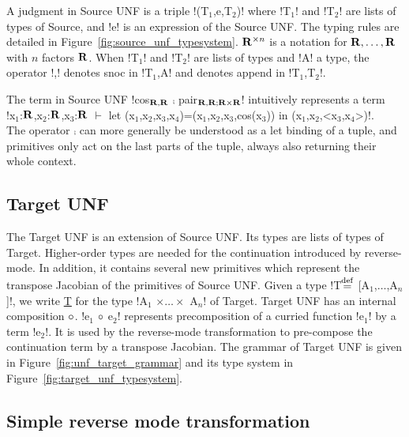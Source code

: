 A judgment in Source UNF is a triple !(T$_1$,e,T$_2$)! where !T$_1$! and !T$_2$! are lists of types of Source, and !e! is an expression of the Source UNF.
The typing rules are detailed in Figure~\ref{fig:source_unf_typesystem}.
$\mathbf{R}^{\times n}$ is a notation for $\mathbf{R},\ldots,\mathbf{R}$ with $n$ factors $\mathbf{R}$. 
When !T$_1$! and !T$_2$! are lists of types and !A! a type, the operator !,! denotes snoc in !T$_1$,A! and denotes append in !T$_1$,T$_2$!.

\begin{example}
    \label{exm:unf}
    The term in Source UNF !cos$_{\mathbf{R},\mathbf{R}}$ $\comp$ pair$_{\mathbf{R},\mathbf{R}; \mathbf{R}\times\mathbf{R}}$! 
    intuitively represents a term \\
    !x$_1$:$\mathbf{R}$,x$_2$:$\mathbf{R}$,x$_3$:$\mathbf{R}$ $\vdash$ let (x$_1$,x$_2$,x$_3$,x$_4$)=(x$_1$,x$_2$,x$_3$,cos(x$_3$)) in (x$_1$,x$_2$,<x$_3$,x$_4$>)!.\\
    The operator $\comp$ can more generally be understood as a let binding of a tuple, and primitives only act on the last parts of the tuple, always also returning their whole context.
\end{example}

\subsection{Target UNF} %
\label{sub:Target UNF}

The Target UNF is an extension of Source UNF. 
Its types are lists of types of Target. 
Higher-order types are needed for the continuation introduced by reverse-mode. 
In addition, it contains several new primitives which represent the transpose Jacobian of the primitives of Source UNF.
Given a type !T$\stackrel {\mathrm{def}}=$ [A$_1$,$\ldots$,A$_n$]!, we write \underline{T} for the type !A$_1$ $\times\ldots\times$ A$_n$! of Target. 
Target UNF has an internal composition $\circ$. 
!e$_{1}$ $\circ$ e$_{2}$! represents precomposition of a curried function !e$_{1}$! by a term !e$_{2}$!.
It is used by the reverse-mode transformation to pre-compose the continuation term by a transpose Jacobian.
The grammar of Target UNF is given in Figure~\ref{fig:unf_target_grammar} and its type system in Figure~\ref{fig:target_unf_typesystem}.



\subsection{Simple reverse mode transformation} %
\label{sub:Simple reverse mode transformation}

